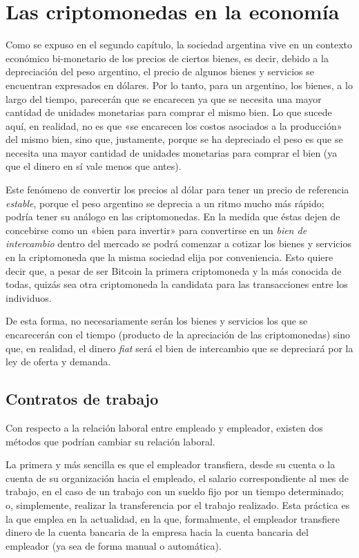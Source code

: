 \documentclass[12pt,a4paper,twoside]{book}
\begin{document}
\section{Las criptomonedas en la economía}
Como se expuso en el segundo capítulo, la sociedad argentina vive en un contexto económico bi-monetario de los precios de ciertos bienes, es decir, debido a la depreciación del peso argentino, el precio de algunos bienes y servicios se encuentran expresados en dólares. Por lo tanto, para un argentino, los bienes, a lo largo del tiempo, parecerán que se encarecen ya que se necesita una mayor cantidad de unidades monetarias para comprar el mismo bien. Lo que sucede aquí, en realidad, no es que «se encarecen los costos asociados a la producción» del mismo bien, sino que, justamente, porque se ha depreciado el peso es que se necesita una mayor cantidad de unidades monetarias para comprar el bien (ya que el dinero en sí vale menos que antes).

Este fenómeno de convertir los precios al dólar para tener un precio de referencia \textit{estable}, porque el peso argentino se deprecia a un ritmo mucho más rápido; podría tener su análogo en las criptomonedas. En la medida que éstas dejen de concebirse como un «bien para invertir» para convertirse en un \textit{bien de intercambio} dentro del mercado se podrá comenzar a cotizar los bienes y servicios en la criptomoneda que la misma sociedad elija por conveniencia. Esto quiere decir que, a pesar de ser Bitcoin la primera criptomoneda y la más conocida de todas, quizás sea otra criptomoneda la candidata para las transacciones entre los individuos.

De esta forma, no necesariamente serán los bienes y servicios los que se encarecerán con el tiempo (producto de la apreciación de las criptomonedas) sino que, en realidad, el dinero \textit{fiat} será el bien de intercambio que se depreciará por la ley de oferta y demanda.

\subsection{Contratos de trabajo}
Con respecto a la relación laboral entre empleado y empleador, existen dos métodos que podrían cambiar su relación laboral.

La primera y más sencilla es que el empleador transfiera, desde su cuenta o la cuenta de su organización hacia el empleado, el salario correspondiente al mes de trabajo, en el caso de un trabajo con un sueldo fijo por un tiempo determinado; o, simplemente, realizar la transferencia por el trabajo realizado. Esta práctica es la que emplea en la actualidad, en la que, formalmente, el empleador transfiere dinero de la cuenta bancaria de la empresa hacia la cuenta bancaria del empleador (ya sea de forma manual o automática).
\end{document}
